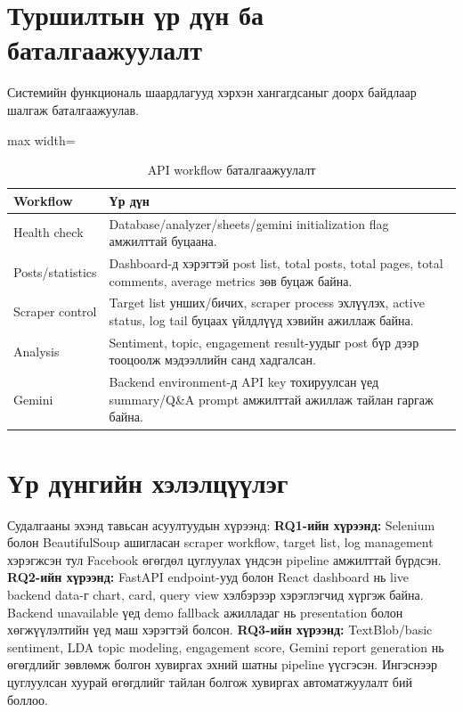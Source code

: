 \section{Туршилтын үр дүн ба баталгаажуулалт}

Системийн функциональ шаардлагууд хэрхэн хангагдсаныг доорх байдлаар шалгаж баталгаажуулав.

\begin{table}[H]
\centering
\caption{API workflow баталгаажуулалт}
\small
\renewcommand{\arraystretch}{1.25}
\begin{adjustbox}{max width=\textwidth}
\begin{tabular}{|p{3.6cm}|p{9.8cm}|}
\hline
\rowcolor{gray!20}\textbf{Workflow} & \textbf{Үр дүн} \\
\hline
Health check & Database/analyzer/sheets/gemini initialization flag амжилттай буцаана. \\
\hline
Posts/statistics & Dashboard-д хэрэгтэй post list, total posts, total pages, total comments, average metrics зөв буцаж байна. \\
\hline
Scraper control & Target list унших/бичих, scraper process эхлүүлэх, active status, log tail буцаах үйлдлүүд хэвийн ажиллаж байна. \\
\hline
Analysis & Sentiment, topic, engagement result-уудыг post бүр дээр тооцоолж мэдээллийн санд хадгалсан. \\
\hline
Gemini & Backend environment-д API key тохируулсан үед summary/Q\&A prompt амжилттай ажиллаж тайлан гаргаж байна. \\
\hline
\end{tabular}
\end{adjustbox}
\normalsize
\end{table}

\section{Үр дүнгийн хэлэлцүүлэг}

Судалгааны эхэнд тавьсан асуултуудын хүрээнд:
\textbf{RQ1-ийн хүрээнд:} Selenium болон BeautifulSoup ашигласан scraper workflow, target list, log management хэрэгжсэн тул Facebook өгөгдөл цуглуулах үндсэн pipeline амжилттай бүрдсэн.
\textbf{RQ2-ийн хүрээнд:} FastAPI endpoint-ууд болон React dashboard нь live backend data-г chart, card, query view хэлбэрээр хэрэглэгчид хүргэж байна. Backend unavailable үед demo fallback ажилладаг нь presentation болон хөгжүүлэлтийн үед маш хэрэгтэй болсон.
\textbf{RQ3-ийн хүрээнд:} TextBlob/basic sentiment, LDA topic modeling, engagement score, Gemini report generation нь өгөгдлийг зөвлөмж болгон хувиргах эхний шатны pipeline үүсгэсэн. Ингэснээр цуглуулсан хуурай өгөгдлийг тайлан болгож хувиргах автоматжуулалт бий боллоо.

